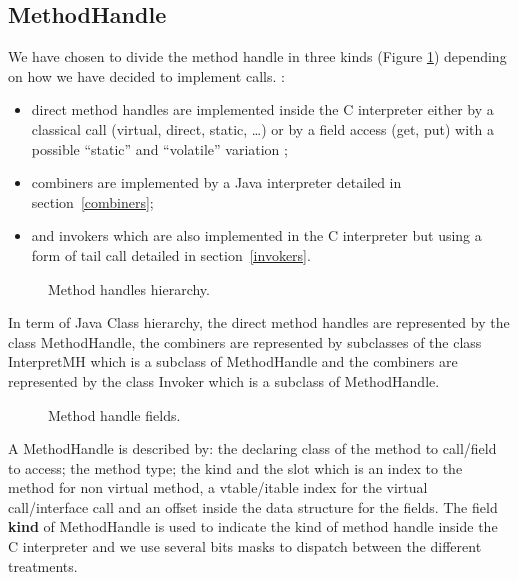 \documentclass{sig-alternate}
\begin{document}
    \subsection{MethodHandle}
      We have chosen to divide the method handle in three kinds (Figure \ref{mhHier})
      depending on how we have decided to implement calls.
      :
      \begin{itemize}
        \item direct method handles are implemented inside the C interpreter
              either by a classical call (virtual, direct, static, \dots)
              or by a field access (get, put) with a possible ``static'' and ``volatile'' variation ;
        \item combiners are implemented by a Java interpreter detailed in section~\ref{combiners};
        \item and invokers which are also implemented in the C interpreter but using a form of tail call
              detailed in section~\ref{invokers}.
      \end{itemize}

      \begin{figure}[!h]
        \centering \resizebox{\linewidth}{!}{}
        \caption{Method handles hierarchy.}
        \label{mhHier}
      \end{figure}

      In term of Java Class hierarchy, the direct method handles are represented by the class MethodHandle,
      the combiners are represented by subclasses of the class InterpretMH which is a subclass of MethodHandle
      and the combiners are represented by the class Invoker which is a subclass of MethodHandle.

      \begin{figure}[!h]
        \centering \vspace{-1.5em}
        \caption{Method handle fields.}
        \label{mhFields}
      \end{figure}

      A MethodHandle is described by: the declaring class of the method to call/field to access;
      the method type; the kind and the slot which is an index to the method for non virtual method,
      a vtable/itable index for the virtual call/interface call and an offset inside the data structure
      for the fields.
      The field {\bf kind} of MethodHandle is used to indicate the kind of method handle inside the C interpreter and we use
      several bits masks to dispatch between the different treatments.
\end{document}
